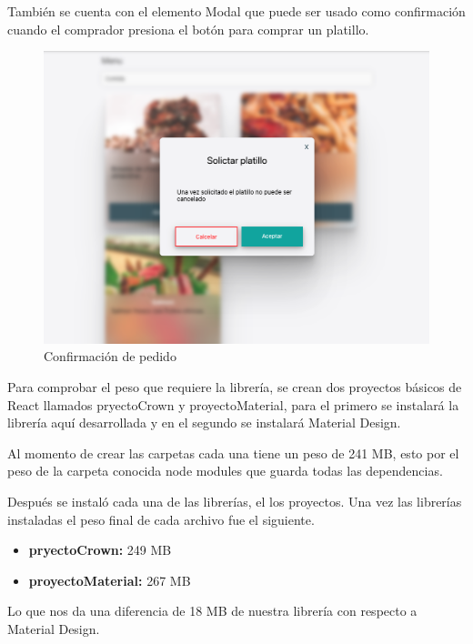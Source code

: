 También se cuenta con el elemento Modal que puede ser usado como confirmación cuando el comprador presiona el botón para comprar un platillo.
\newline
\begin{figure}[H]
    \includegraphics[width=1\textwidth]{./Imagenes/9.15.png}
   \centering 
    \caption[Confirmación de pedido]{Confirmación de pedido}
    \end{figure}
\newline

Para comprobar el peso que requiere la librería, se crean dos proyectos básicos de React \cite{CRA}  llamados pryectoCrown y proyectoMaterial, para el primero se instalará la librería aquí desarrollada y en el segundo se instalará Material Design.

Al momento de crear las carpetas cada una tiene un peso de 241 MB, esto por el peso de la carpeta conocida node modules que guarda todas las dependencias.

Después se instaló cada una de las librerías, el los proyectos. Una vez las librerías instaladas el peso final de cada archivo fue el siguiente.

 \begin{itemize}
  \item \textbf{pryectoCrown:}  249 MB
   \item \textbf{proyectoMaterial:}   267 MB
 \end{itemize}
 

Lo que nos da una diferencia de 18 MB de nuestra librería con respecto a Material Design.

